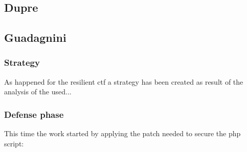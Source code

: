 \documentclass[14pt]{article}
\begin{document}
\subsection{Dupre}

\subsection{Guadagnini}

\subsubsection{Strategy}
As happened for the resilient ctf a strategy has been created as result of the analysis of the used...

\subsubsection{Defense phase}
This time the work started by applying the patch needed to secure the php script:
\end{document}
